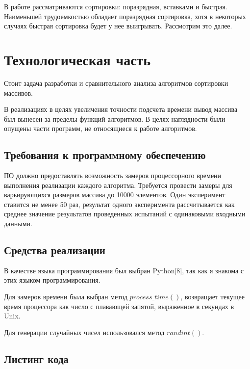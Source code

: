 \documentclass[a4paper,14pt]{article} %
\begin{document}
	\hfill
	
	В работе рассматриваются сортировки: поразрядная, вставками и быстрая. Наименьшей трудоемкостью обладает поразрядная сортировка, хотя в некоторых случаях быстрая сортировка будет у нее выигрывать. Рассмотрим это далее. 
	
    	\newpage

        \section{Технологическая часть}
        \hfill
        
        Стоит задача разработки и сравнительного анализа алгоритмов сортировки массивов.
        
        В реализациях в целях увеличения точности подсчета времени вывод массива был вынесен за пределы функций-алгоритмов. В целях наглядности были опущены части программ, не относящиеся к работе алгоритмов.
       
        \subsection{Требования к программному обеспечению}
        \hfill
        
        ПО должно предоставлять возможность замеров процессорного времени выполнения реализации каждого алгоритма. Требуется провести замеры для варьирующихся размеров массива до 10000 элементов. Один эксперимент ставится не менее 50 раз, результат одного эксперимента рассчитывается как среднее значение результатов проведенных испытаний с одинаковыми входными данными.
        \hfill
        
        \subsection{Средства реализации}
        \hfill
        
        В качестве языка программирования был выбран Python[8], так как я знакома с этих языком программирования. 
        \hfill
        
        Для замеров времени была выбран метод $process\_time()$, возвращает текущее время процессора как число с плавающей запятой, выраженное в секундах в Unix.
        \hfill
        
        Для генерации случайных чисел использовался метод $randint()$. 
        \hfill
        
        \subsection{Листинг кода}
        \hfill
        
\end{document}

